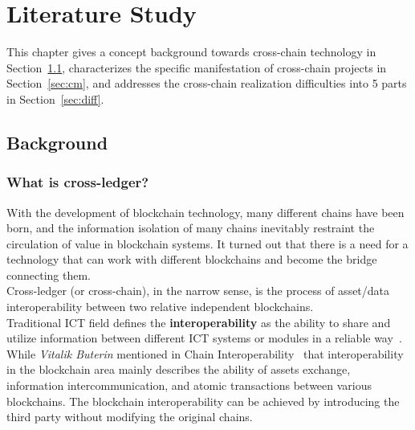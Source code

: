 \chapter{Literature Study} 
\label{chap:2}
\noindent This chapter gives a concept background towards cross-chain technology in Section~\ref{sec:back}, characterizes the specific manifestation of cross-chain projects in Section~\ref{sec:cm}, and addresses the cross-chain realization difficulties into 5 parts in Section~\ref{sec:diff}.

\section{Background}
\label{sec:back}
\subsection{What is cross-ledger?}
\noindent With the development of blockchain technology, many different chains have been born, and the information isolation of many chains inevitably restraint  the circulation of value in blockchain systems. It turned out that there is a need for a technology that can work with different blockchains and become the bridge connecting them. \\

\noindent Cross-ledger (or cross-chain), in the narrow sense, is the process of asset/data interoperability between two relative independent blockchains.\\

\noindent Traditional ICT field defines the \textbf{interoperability} as the ability to share and utilize information between different ICT systems or modules in a reliable way~\cite{osello2015bim}. While \textit{Vitalik Buterin} mentioned in Chain Interoperability~\cite{buterin2016chain} that interoperability in the blockchain area mainly describes the ability of assets exchange, information intercommunication, and atomic transactions between various blockchains. The blockchain interoperability can be achieved by introducing the third party without modifying the original chains.

